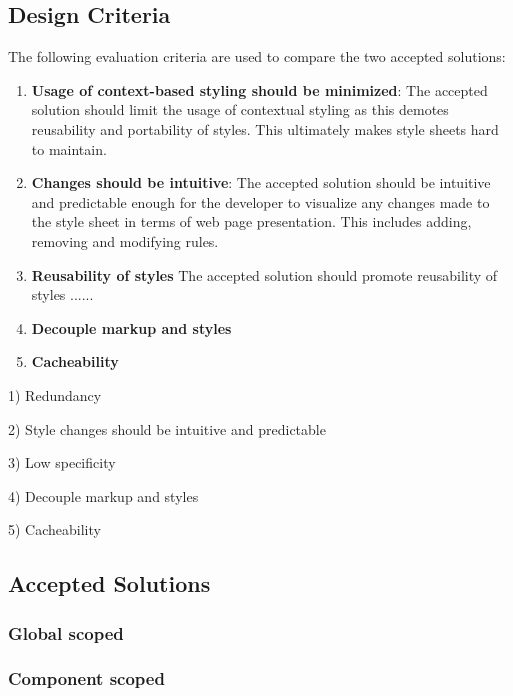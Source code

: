 \documentclass[12pt]{article}
\begin{document}
\subsection{Design Criteria}
The following evaluation criteria are used to compare the two accepted solutions:
\begin{enumerate}
	\item \textbf{Usage of context-based styling should be minimized}: The accepted solution should limit the usage of contextual styling as this demotes reusability and portability of styles. This ultimately makes style sheets hard to maintain.

	\item \textbf{Changes should be intuitive}: The accepted solution should be intuitive and predictable enough for the developer to visualize any changes made to the style sheet in terms of web page presentation. This includes adding, removing and modifying rules.


	\item \textbf{Reusability of styles} The accepted solution should promote reusability of styles ......

	\item \textbf{Decouple markup and styles}
	\item \textbf{Cacheability}
\end{enumerate}

1) Redundancy

2) Style changes should be intuitive and predictable

3) Low specificity

4) Decouple markup and styles

5) Cacheability

\subsection{Accepted Solutions}
\subsubsection{Global scoped}
\subsubsection{Component scoped}
\end{document}
